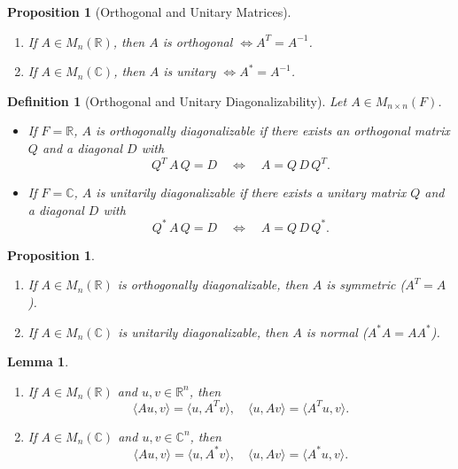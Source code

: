 \documentclass[12pt]{article}
\theoremstyle{break}             %
\newtheorem{prop}[thm]{Proposition}%
\newtheorem{lem}[thm]{Lemma}
\newtheorem{defn}[thm]{Definition}
\begin{document}
\begin{prop}[Orthogonal and Unitary Matrices]\leavevmode\vspace{-20.5pt}
\begin{enumerate}
  \item If \(A\in M_{n}(\mathbb{R})\), then \(A\) is orthogonal \(\Leftrightarrow A^T = A^{-1}\).
  \item If \(A\in M_{n}(\mathbb{C})\), then \(A\) is unitary \(\Leftrightarrow A^* = A^{-1}\).
\end{enumerate}
\end{prop}

\begin{defn}[Orthogonal and Unitary Diagonalizability]
Let \(A\in M_{n\times n}(F)\).
\begin{itemize}
  \item If \(F=\mathbb R\), \(A\) is \emph{orthogonally diagonalizable} if there exists an orthogonal matrix \(Q\) and a diagonal \(D\) with
  \[
    Q^T\,A\,Q = D
    \quad\Longleftrightarrow\quad
    A = Q\,D\,Q^T.
  \]
  \item If \(F=\mathbb C\), \(A\) is \emph{unitarily diagonalizable} if there exists a unitary matrix \(Q\) and a diagonal \(D\) with
  \[
    Q^*\,A\,Q = D
    \quad\Longleftrightarrow\quad
    A = Q\,D\,Q^*.
  \]
\end{itemize}
\end{defn}

\begin{prop}\leavevmode\vspace{-20.5pt}
\begin{enumerate}
  \item If \(A\in M_{n}(\mathbb{R})\) is orthogonally diagonalizable, then \(A\) is symmetric (\(A^T = A\)).
  \item If \(A\in M_{n}(\mathbb{C})\) is unitarily diagonalizable, then \(A\) is normal (\(A^*A = AA^*\)).
\end{enumerate}
\end{prop}

\begin{lem}\leavevmode\vspace{-20.5pt}
\begin{enumerate}
  \item If \(A\in M_{n}(\mathbb{R})\) and \(u,v\in\mathbb{R}^n\), then
  \[
    \langle A u, v\rangle = \langle u, A^T v\rangle,
    \quad
    \langle u, A v\rangle = \langle A^T u, v\rangle.
  \]
  \item If \(A\in M_{n}(\mathbb{C})\) and \(u,v\in\mathbb{C}^n\), then
  \[
    \langle A u, v\rangle = \langle u, A^* v\rangle,
    \quad
    \langle u, A v\rangle = \langle A^* u, v\rangle.
  \]
\end{enumerate}
\end{lem}
\end{document}
